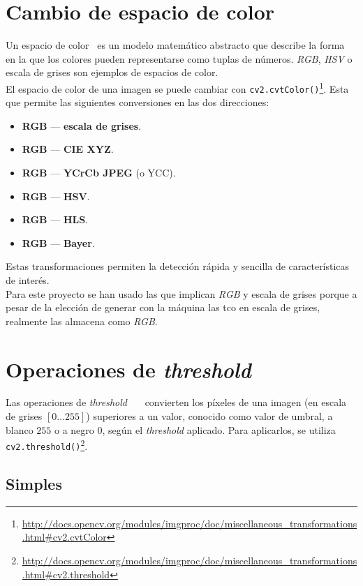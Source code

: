 \section{Cambio de espacio de color}\label{tecnica:cambio-color}
Un espacio de color~\emph{\citep*[Changing
  Colorspaces]{opencv_tutorial-bib}} es un modelo matemático abstracto
que describe la forma en la que los colores pueden representarse como
tuplas de
números. \emph{RGB}, \emph{HSV} o escala de grises son ejemplos de espacios de color. \\
El espacio de color de una imagen se puede cambiar con
\texttt{cv2.cvtColor()}\footnote{\url{http://docs.opencv.org/modules/imgproc/doc/miscellaneous\_transformations.html\#cv2.cvtColor}}. Esta
que permite las siguientes conversiones en las dos direcciones:
\begin{itemize}
\item \textbf{RGB} --- \textbf{escala de grises}.
\item \textbf{RGB} --- \textbf{CIE XYZ}.
\item \textbf{RGB} --- \textbf{YCrCb JPEG} (o YCC).
\item \textbf{RGB} --- \textbf{HSV}.
\item \textbf{RGB} --- \textbf{HLS}.
\item \textbf{RGB} --- \textbf{Bayer}.
\end{itemize}
Estas transformaciones permiten la detección rápida y sencilla de
características de interés. \\
Para este proyecto se han usado las que implican \emph{RGB} y escala
de grises porque a pesar de la elección de generar con la máquina las
\gls{tco} en escala de grises, realmente las almacena como \emph{RGB}.

\section{Operaciones de \emph{threshold}}
Las operaciones de \emph{threshold}~\emph{\citep*[Image
  Thresholding]{opencv_tutorial-bib}}~\emph{\citep*[Threshold]{opencv_book-bib}}~\emph{\citep*[6.5
  Thresholding]{toennies2012guide}} convierten los píxeles de una
imagen (en escala de grises $\left[0 \dots 255\right]$) superiores a
un valor, conocido como valor de umbral, a blanco $255$ o a negro $0$,
según el \emph{threshold} aplicado. Para aplicarlos, se utiliza
\texttt{cv2.threshold()}\footnote{\url{http://docs.opencv.org/modules/imgproc/doc/miscellaneous_transformations.html\#cv2.threshold}}.
\subsection{Simples}
